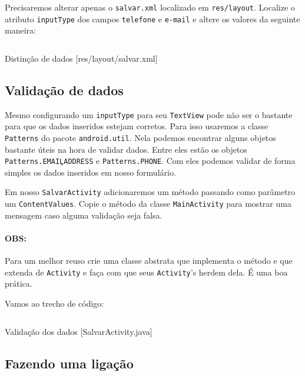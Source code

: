 Precisaremos alterar apenas o \texttt{salvar.xml} localizado em \texttt{res/layout}. Localize o atributo
\texttt{inputType} dos campos \texttt{telefone} e \texttt{e-mail} e altere os valores da seguinte maneira:

\begin{listing}[H]
  \inputminted[linenos=true,frame=bottomline,tabsize=3]{ xml }{ source/salvar-2.xml }
  \caption{Distinção de dados [res/layout/salvar.xml]}
\end{listing}

\subsection{Validação de dados}

Mesmo configurando um \texttt{inputType} para seu \texttt{TextView} pode não ser o bastante para que
os dados inseridos estejam corretos. Para isso usaremos a classe \texttt{Patterns} do pacote
\texttt{android.util}. Nela podemos encontrar alguns objetos bastante úteis na hora de validar
dados. Entre eles estão os objetos \texttt{Patterns.EMAIL\b{ }ADDRESS} e \texttt{Patterns.PHONE}. Com
eles podemos validar de forma simples os dados inseridos em nosso formulário.

Em nosso \texttt{SalvarActivity} adicionaremos um método  passando como parâmetro
um \texttt{ContentValues}. Copie o método  da classe \texttt{MainActivity} para
mostrar uma mensagem caso alguma validação seja falsa.

\paragraph{OBS:} Para um melhor reuso crie uma classe abstrata que implementa o método 
e que extenda de \texttt{Activity} e faça com que seus \texttt{Activity}'s herdem dela. É uma boa
prática.

Vamos ao trecho de código:

\begin{listing}[H]
  \inputminted[linenos=true,frame=bottomline,tabsize=3]{ java }{ source/SalvarActivity-4.java }
  \caption{Validação dos dados [SalvarActivity.java]}
\end{listing}

\subsection{Fazendo uma ligação}

